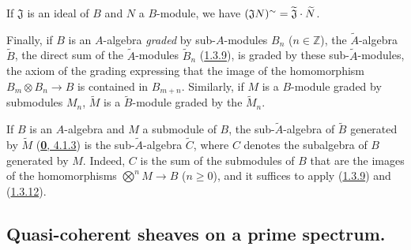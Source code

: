 \begin{env}[1.3.13]
If $\mathfrak{J}$ is an ideal of $B$ and $N$ a $B$-module, we have
$(\mathfrak{J}N)^{\sim}=\widetilde{\mathfrak{J}}\cdot\widetilde{N}$.

Finally, if $B$ is an $A$-algebra \emph{graded} by sub-$A$-modules $B_n$
($n\in\mathbb{Z}$), the $\widetilde{A}$-algebra $\widetilde{B}$, the direct
sum of the $\widetilde{A}$-modules $\widetilde{B}_n$
(\hyperref[I.1.3.9]{1.3.9}), is graded by these
sub-$\widetilde{A}$-modules, the axiom of the grading expressing that the
image of the homomorphism $B_m\otimes B_n\to B$ is contained in
$B_{m+n}$. Similarly, if $M$ is a $B$-module graded by submodules $M_n$,
$\widetilde{M}$ is a $\widetilde{B}$-module graded by the
$\widetilde{M}_n$.
\end{env}

\begin{env}[1.3.14]
\label{I.1.3.14}
If $B$ is an $A$-algebra and $M$ a submodule of $B$, the
sub-$\widetilde{A}$-algebra of $\widetilde{B}$ generated by $\widetilde{M}$
(\hyperref[0.4.1.3]{\textbf{0}, 4.1.3}) is the sub-$\widetilde{A}$-algebra
$\widetilde{C}$, where $C$ denotes the subalgebra of $B$ generated by
$M$. Indeed, $C$ is the sum of the submodules of $B$ that are the images of
the homomorphisms $\bigotimes^n M\to B$ ($n\geq0$), and it suffices to
apply (\hyperref[I.1.3.9]{1.3.9}) and (\hyperref[I.1.3.12]{1.3.12}).
\end{env}


\subsection{Quasi-coherent sheaves on a prime spectrum.}
\label{subsection:I.1.4}

